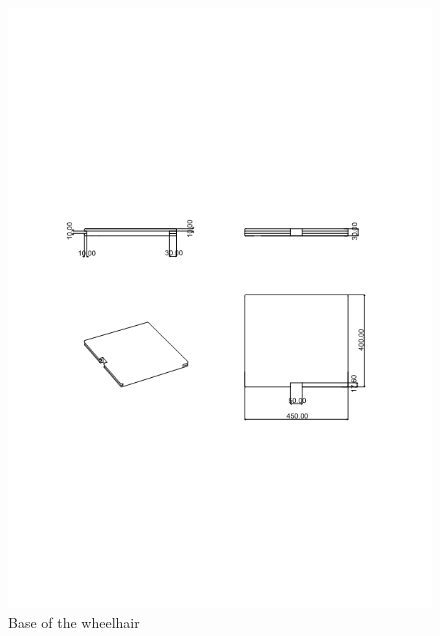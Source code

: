 \begin{figure}[h]
\centering
\includegraphics[width=15cm]{images/base.png}
\caption{Base of the wheelhair}
\label{fig:base}
\end{figure}

